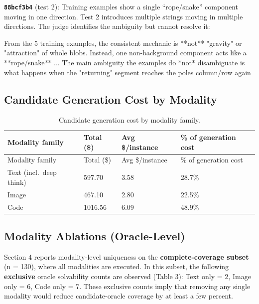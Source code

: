 \documentclass[10pt]{article}
\newenvironment{Shaded}{}{}
\newcommand{\NormalTok}[1]{#1}
\begin{document}
\textbf{\texttt{88bcf3b4}} (test 2): Training examples show a single
``rope/snake'' component moving in one direction. Test 2 introduces
multiple strings moving in multiple directions. The judge identifies the
ambiguity but cannot resolve it:

\begin{Shaded}
\begin{Highlighting}[]
\NormalTok{From the 5 training examples, the consistent mechanic is **not** "gravity" or}
\NormalTok{"attraction" of whole blobs. Instead, one non{-}background component acts like a}
\NormalTok{**rope/snake**}
\NormalTok{...}
\NormalTok{The main ambiguity the examples do *not* disambiguate is what happens when the}
\NormalTok{"returning" segment reaches the pole\textquotesingle{}s column/row again}
\end{Highlighting}
\end{Shaded}

\hypertarget{candidate-generation-cost-by-modality}{%
\subsection{Candidate Generation Cost by
Modality}\label{candidate-generation-cost-by-modality}}

\begin{longtable}[]{@{}llll@{}}
\caption{Candidate generation cost by modality family.}\tabularnewline
\toprule\noalign{}
Modality family & Total (\$) & Avg \$/instance & \% of generation
cost \\
\midrule\noalign{}
\endfirsthead
\toprule\noalign{}
Modality family & Total (\$) & Avg \$/instance & \% of generation
cost \\
\midrule\noalign{}
\endhead
\bottomrule\noalign{}
\endlastfoot
Text (incl.~deep think) & 597.70 & 3.58 & 28.7\% \\
Image & 467.10 & 2.80 & 22.5\% \\
Code & 1016.56 & 6.09 & 48.9\% \\
\end{longtable}

\hypertarget{modality-ablations-oracle-level}{%
\subsection{Modality Ablations
(Oracle-Level)}\label{modality-ablations-oracle-level}}

Section 4 reports modality-level uniqueness on the
\textbf{complete-coverage subset} (n = 130), where all modalities are
executed. In this subset, the following \textbf{exclusive} oracle
solvability counts are observed (Table 3): Text only = 2, Image only =
6, Code only = 7. These exclusive counts imply that removing any single
modality would reduce candidate-oracle coverage by at least a few
percent.
\end{document}
